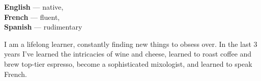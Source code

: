 \documentclass[9pt]{developercv} %
\begin{document}
%
\begin{minipage}[t]{0.2\textwidth}
    \vspace{-\baselineskip} %


    \textbf{English} — native,\\
    \textbf{French} — fluent,\\
    \textbf{Spanish} — rudimentary

\end{minipage}
\hfill
\begin{minipage}[t]{0.7\textwidth}
    \vspace{-\baselineskip} %


    I am a lifelong learner, constantly finding new things to obsess over. In
    the last 3 years I've learned the intricacies of wine and cheese, learned to
    roast coffee and brew top-tier espresso, become a sophisticated mixologist,
    and learned to speak French.
\end{minipage}
%
%

\end{document}
